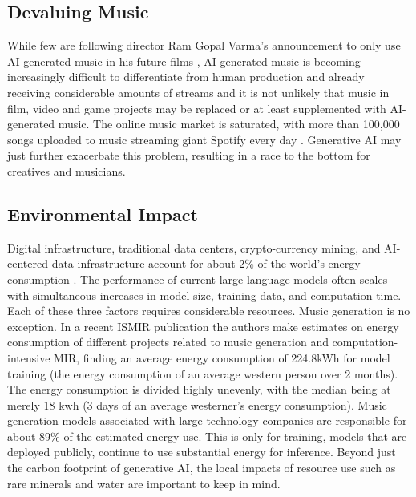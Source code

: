 \subsection{Devaluing Music}
While few are following director Ram Gopal Varma’s announcement to only use AI-generated music in his future films \cite{Singh_2024}, AI-generated music is becoming increasingly difficult to differentiate from human production and already receiving considerable amounts of streams and it is not unlikely that music in film, video and game projects may be replaced or at least supplemented with AI-generated music. The online music market is saturated, with more than 100,000 songs uploaded to music streaming giant Spotify every day \cite{Stassen_2023}. Generative AI may just further exacerbate this problem, resulting in a race to the bottom for creatives and musicians. 

\subsection{Environmental Impact}
Digital infrastructure, traditional data centers, crypto-currency mining, and AI-centered data infrastructure account for about 2\% of the world's energy consumption \cite{Marechal_2024}. The performance of current large language models often scales with simultaneous increases in model size, training data, and computation time.\cite{Kaplan_McCandlish_Henighan_Brown_Chess_Child_Gray_Radford_Wu_Amodei_2020}  Each of these three factors requires considerable resources. Music generation is no exception. In a recent ISMIR publication \cite{Holzapfel_Kaila_Jääskeläinen_2024} the authors make estimates on energy consumption of different projects related to music generation and computation-intensive MIR, finding an average energy consumption of 224.8kWh for model training (the energy consumption of an average western person over 2 months). The energy consumption is divided highly unevenly, with the median being at merely 18 kwh (3 days of an average westerner's energy consumption). Music generation models associated with large technology companies are responsible for about 89\% of the estimated energy use. This is only for training, models that are deployed publicly, continue to use substantial energy for inference. Beyond just the carbon footprint of generative AI, the local impacts of resource use such as rare minerals and water are important to keep in mind. 

